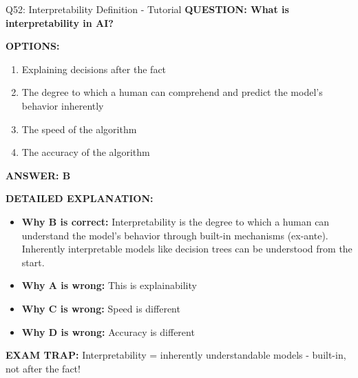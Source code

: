 \documentclass[8pt]{beamer}
\begin{document}
	\begin{frame}{Q52: Interpretability Definition - Tutorial}
		\fontsize{6.5}{7.5}\selectfont
		\textbf{QUESTION: What is interpretability in AI?}
		
		\vspace{0.1cm}
		\textbf{OPTIONS:}
		\begin{enumerate}
			\item Explaining decisions after the fact
			\item The degree to which a human can comprehend and predict the model's behavior inherently
			\item The speed of the algorithm
			\item The accuracy of the algorithm
		\end{enumerate}
		
		\vspace{0.1cm}
		\textcolor{myblue}{\textbf{ANSWER: B}}
		
		\vspace{0.1cm}
		\textbf{DETAILED EXPLANATION:}
		\begin{itemize}
			\item \textbf{Why B is correct:} Interpretability is the degree to which a human can understand the model's behavior through built-in mechanisms (ex-ante). Inherently interpretable models like decision trees can be understood from the start.
			\item \textbf{Why A is wrong:} This is explainability
			\item \textbf{Why C is wrong:} Speed is different
			\item \textbf{Why D is wrong:} Accuracy is different
		\end{itemize}
		
		\textcolor{myred}{\textbf{EXAM TRAP:}} Interpretability = \textcolor{myblue}{inherently understandable models} - built-in, not after the fact!
	\end{frame}
	
\end{document}
